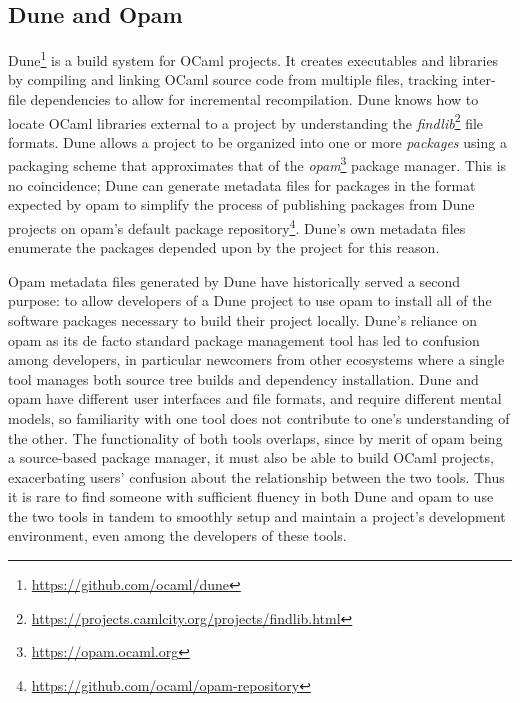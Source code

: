 \documentclass{article}
\begin{document}
    \begin{multicols}{2}

        \section{Dune and Opam}

        Dune\footnote{\url{https://github.com/ocaml/dune}} is a build system for OCaml
        projects. It creates executables and libraries by compiling and linking
        OCaml source code from multiple files, tracking inter-file dependencies
        to allow for incremental recompilation. Dune knows how to locate OCaml
        libraries external to a project by understanding the
        \textit{findlib}\footnote{\url{https://projects.camlcity.org/projects/findlib.html}}
        file formats. Dune allows a project to be organized into one or more
        \textit{packages} using a packaging scheme that approximates that of the
        \textit{opam}\footnote{\url{https://opam.ocaml.org}} package manager. This is
        no coincidence; Dune can generate metadata files for packages in the
        format expected by opam to simplify the process of publishing packages
        from Dune projects on opam's default package
        repository\footnote{\url{https://github.com/ocaml/opam-repository}}. Dune's
        own metadata files enumerate the packages depended upon by the project
        for this reason.

        Opam metadata files generated by Dune have historically served a second
        purpose: to allow developers of a Dune project to use opam to
        install all of the software packages necessary to build their
        project locally. Dune's reliance on opam as its de facto standard
        package management tool has led to confusion among developers, in
        particular newcomers from other ecosystems where a single tool
        manages both source tree builds and dependency installation. Dune
        and opam have different user interfaces and file formats, and require
        different mental models, so familiarity with one tool does not
        contribute to one's understanding of the other. The functionality
        of both tools overlaps, since by merit of opam being a source-based
        package manager, it must also be able to build OCaml projects,
        exacerbating users' confusion about the relationship between the
        two tools. Thus it is rare to find someone with sufficient fluency
        in both Dune and opam to use the two tools in tandem to smoothly
        setup and maintain a project's development environment, even among
        the developers of these tools.


\end{multicols}
\end{document}
